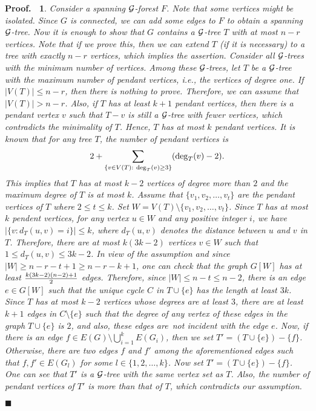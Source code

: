\documentclass[11pt]{article}
\newtheorem{preproof}{{\bf Proof.\ }}
\newenvironment{proof}[1]{\begin{preproof}{\rm
               #1}\hfill{$\blacksquare$}}{\end{preproof}}
\begin{document}
\begin{proof}{
Consider a spanning  ${\cal G}$-forest $F$. Note that some vertices might be isolated. 
Since $G$ is connected, we can add some edges to $F$ to obtain a spanning ${\cal G}$-tree.  
Now it is enough to show that $G$ contains a ${\cal G}$-tree $T$ with at most $n-r$ vertices.  
Note that if we prove this, then we can extend $T$ (if it is necessary) to a tree with exactly $n-r$ vertices, which implies the assertion. Consider all ${\cal G}$-trees with the minimum number of vertices. Among these ${\cal G}$-trees, 
let $T$ be a ${\cal G}$-tree with the maximum number of pendant vertices, i.e., the vertices of degree one. 
If $|V(T)|\leq n-r$, then there is nothing to prove.
Therefore, we  can assume that $|V(T)|>n-r$. Also, if $T$ has at least $k+1$ pendant vertices, 
then there is a pendant vertex $v$ such that $T - v$ is still a ${\cal G}$-tree 
with fewer vertices, which contradicts the minimality of $T$.
Hence, $T$ has at most $k$ pendant vertices. 
It is known that for any tree $T$, the number of pendant vertices is  
$$2+\sum_{\{v\in V(T):\ {\rm deg}_T(v)\geq 3\}}({\rm deg}_T(v)-2).$$ 
This implies that $T$ has at most $k-2$ vertices of degree more than $2$ and the maximum degree of $T$ is at most $k$.
Assume that $\{v_1,v_2,\ldots,v_t\}$ are the pendant vertices of $T$ where $2\leq t\leq k$. 
Set $W=V(T)\setminus \{v_1,v_2,\ldots,v_t\}$.
Since $T$ has at most $k$ pendent vertices, 
for any vertex $u\in W$ and any positive integer $i$, we have $|\{v: d_T(u,v)=i\}|\leq k$, where $d_T(u,v)$ denotes the distance 
between $u$ and $v$ in $T$. Therefore,
there are at most $k(3k-2)$  vertices $v\in W$ such that $1\leq d_T(u,v)\leq 3k-2$.
In view of the assumption and since $|W|\geq n-r-t+1\geq n-r-k+1$, one can check that the graph $G[W]$ has
at least ${k(3k-2)(n-2)+1\over 2}$ edges. 
Therefore, since $|W| \leq n-t \leq n-2$, there is an edge $e\in G[W]$
such that the unique cycle $C$ in $T\cup \{e\}$ has the length at least $3k$.
Since $T$ has at most $k-2$ vertices whose degrees are at least $3$, there are at least
$k+1$ edges in $C\setminus\{e\}$ such 
that the degree of any vertex of these edges in the graph $T\cup\{e\}$ is $2$, and also, these edges are~not incident with the edge $e$. 
Now, if there is an edge $f\in E(G)\setminus\bigcup_{i=1}^kE(G_i)$, then we set 
$T'=(T\cup\{e\})-\{f\}$. 
Otherwise, there are two edges $f$ and $f'$ among the aforementioned edges
such that $f,f'\in E(G_l)$ for some $l\in\{1,2,\ldots,k\}$. Now set $T'=(T\cup\{e\})-\{f\}$.
One can see that $T'$ is a ${\cal G}$-tree with the same vertex set as $T$. Also, the number of pendant vertices of $T'$
is more than that of $T$, which contradicts our assumption.
}\end{proof}
\end{document}
